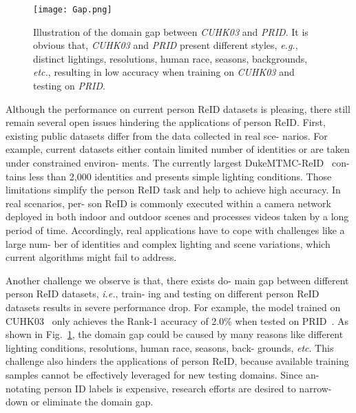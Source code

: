 \documentclass[10pt,twocolumn,letterpaper]{article}
\begin{document}
\begin{figure}[H]
\begin{center}
   \texttt{[image: Gap.png]}
\end{center}
   \caption{Illustration of the domain gap between \emph{CUHK03} and \emph{PRID}. It is obvious that, \emph{CUHK03} and \emph{PRID} present
different styles, \emph{e.g.}, distinct lightings, resolutions, human
race, seasons, backgrounds, \emph{etc.}, resulting in low accuracy
when training on \emph{CUHK03} and testing on \emph{PRID}.\cite{Wei_2018_CVPR}}
\label{fig:Gap}
\end{figure}

Although the performance on current person ReID
datasets is pleasing, there still remain several open issues hindering the applications of person ReID. First, existing
public datasets differ from the data collected in real sce-
narios. For example, current datasets either contain limited
number of identities or are taken under constrained environ-
ments. The currently largest DukeMTMC-ReID~\cite{Zheng2017Unlabeled} con-
tains less than 2,000 identities and presents simple lighting
conditions. Those limitations simplify the person ReID task
and help to achieve high accuracy. In real scenarios, per-
son ReID is commonly executed within a camera network
deployed in both indoor and outdoor scenes and processes
videos taken by a long period of time. Accordingly, real
applications have to cope with challenges like a large num-
ber of identities and complex lighting and scene variations,
which current algorithms might fail to address.\par
Another challenge we observe is that, there exists do-
main gap between different person ReID datasets, \emph{i.e.}, train-
ing and testing on different person ReID datasets results in
severe performance drop. For example, the model trained
on CUHK03~\cite{W2014Deep} only achieves the Rank-1 accuracy of
2.0\% when tested on PRID~\cite{Hirzer2011Person}. As shown in Fig.~\ref{fig:Gap}, the
domain gap could be caused by many reasons like different
lighting conditions, resolutions, human race, seasons, back-
grounds, \emph{etc}. This challenge also hinders the applications of person ReID, because available training samples cannot
be effectively leveraged for new testing domains. Since an-
notating person ID labels is expensive, research efforts are
desired to narrow-down or eliminate the domain gap.\par



{\small


}
\end{document}
